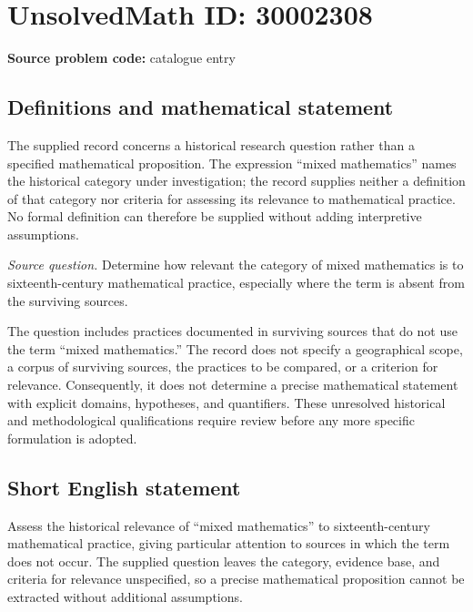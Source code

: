 \documentclass[11pt]{article}
\begin{document}
\section*{UnsolvedMath ID: 30002308}
\textbf{Source problem code:} catalogue entry
\subsection{Definitions and mathematical statement}
The supplied record concerns a historical research question rather than a specified mathematical proposition. The expression ``mixed mathematics'' names the historical category under investigation; the record supplies neither a definition of that category nor criteria for assessing its relevance to mathematical practice. No formal definition can therefore be supplied without adding interpretive assumptions.

\emph{Source question.} Determine how relevant the category of mixed mathematics is to sixteenth-century mathematical practice, especially where the term is absent from the surviving sources.

The question includes practices documented in surviving sources that do not use the term ``mixed mathematics.'' The record does not specify a geographical scope, a corpus of surviving sources, the practices to be compared, or a criterion for relevance. Consequently, it does not determine a precise mathematical statement with explicit domains, hypotheses, and quantifiers. These unresolved historical and methodological qualifications require review before any more specific formulation is adopted.
\subsection{Short English statement}
Assess the historical relevance of ``mixed mathematics'' to sixteenth-century mathematical practice, giving particular attention to sources in which the term does not occur. The supplied question leaves the category, evidence base, and criteria for relevance unspecified, so a precise mathematical proposition cannot be extracted without additional assumptions.
\end{document}
